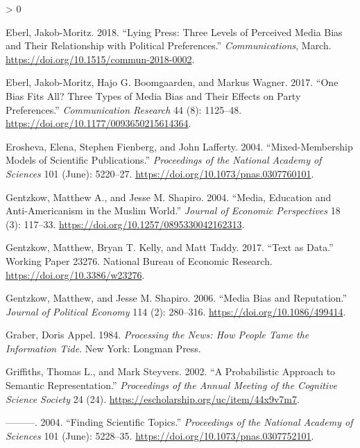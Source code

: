 \documentclass[
  12pt,
]{article}
\newlength{\cslhangindent}
\newenvironment{CSLReferences}[2] %
 {%
  \setlength{\parindent}{0pt}
  \ifodd #1 \everypar{\setlength{\hangindent}{\cslhangindent}}\ignorespaces\fi
  \ifnum #2 > 0
  \setlength{\parskip}{#2\baselineskip}
  \fi
 }%
 {}
\begin{document}
\begin{CSLReferences}{1}{0}
\leavevmode\hypertarget{ref-eberl_lying_2018}{}%
Eberl, Jakob-Moritz. 2018. {``Lying Press: Three Levels of Perceived
Media Bias and Their Relationship with Political Preferences.''}
\emph{Communications}, March.
\url{https://doi.org/10.1515/commun-2018-0002}.

\leavevmode\hypertarget{ref-eberl_one_2017}{}%
Eberl, Jakob-Moritz, Hajo G. Boomgaarden, and Markus Wagner. 2017.
{``One Bias Fits All? Three Types of Media Bias and Their Effects on
Party Preferences.''} \emph{Communication Research} 44 (8): 1125--48.
\url{https://doi.org/10.1177/0093650215614364}.

\leavevmode\hypertarget{ref-erosheva_mixed-membership_2004}{}%
Erosheva, Elena, Stephen Fienberg, and John Lafferty. 2004.
{``Mixed-Membership Models of Scientific Publications.''}
\emph{Proceedings of the National Academy of Sciences} 101 (June):
5220--27. \url{https://doi.org/10.1073/pnas.0307760101}.

\leavevmode\hypertarget{ref-gentzkow_media_2004}{}%
Gentzkow, Matthew A., and Jesse M. Shapiro. 2004. {``Media, Education
and Anti-Americanism in the Muslim World.''} \emph{Journal of Economic
Perspectives} 18 (3): 117--33.
\url{https://doi.org/10.1257/0895330042162313}.

\leavevmode\hypertarget{ref-gentzkow_text_2017}{}%
Gentzkow, Matthew, Bryan T. Kelly, and Matt Taddy. 2017. {``Text as
Data.''} Working Paper 23276. National Bureau of Economic Research.
\url{https://doi.org/10.3386/w23276}.

\leavevmode\hypertarget{ref-gentzkow_media_2006}{}%
Gentzkow, Matthew, and Jesse M. Shapiro. 2006. {``Media Bias and
Reputation.''} \emph{Journal of Political Economy} 114 (2): 280--316.
\url{https://doi.org/10.1086/499414}.

\leavevmode\hypertarget{ref-graber_processing_1984}{}%
Graber, Doris Appel. 1984. \emph{Processing the News: How People Tame
the Information Tide}. New York: Longman Press.

\leavevmode\hypertarget{ref-griffiths_probabilistic_2002}{}%
Griffiths, Thomas L., and Mark Steyvers. 2002. {``A Probabilistic
Approach to Semantic Representation.''} \emph{Proceedings of the Annual
Meeting of the Cognitive Science Society} 24 (24).
\url{https://escholarship.org/uc/item/44x9v7m7}.

\leavevmode\hypertarget{ref-griffiths_finding_2004}{}%
---------. 2004. {``Finding Scientific Topics.''} \emph{Proceedings of
the National Academy of Sciences} 101 (June): 5228--35.
\url{https://doi.org/10.1073/pnas.0307752101}.


\end{CSLReferences}
\end{document}
